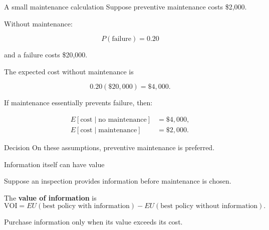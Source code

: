 \documentclass[aspectratio=43,11pt]{beamer}
\begin{document}
\begin{frame}{A small maintenance calculation}
\small
Suppose preventive maintenance costs \$2,000.

Without maintenance:

\[
P(\text{failure})=0.20
\]

and a failure costs \$20,000.

The expected cost without maintenance is

\[
0.20(\$20{,}000)
=
\$4{,}000.
\]

If maintenance essentially prevents failure, then:

\[
\begin{aligned}
E[\text{cost}\mid\text{no maintenance}] &= \$4{,}000,\\
E[\text{cost}\mid\text{maintenance}] &= \$2{,}000.
\end{aligned}
\]

\begin{alertblock}{Decision}
On these assumptions, preventive maintenance is preferred.
\end{alertblock}

\end{frame}

\begin{frame}{Information itself can have value}
\small

Suppose an inspection provides information before maintenance is chosen.

\begin{center}
\end{center}

The \textbf{value of information} is
\footnotesize{
\[
\mathrm{VOI}
=
EU(\text{best policy with information})
-
EU(\text{best policy without information}).
\]
}

Purchase information only when its value exceeds its cost.

\end{frame}
\end{document}
